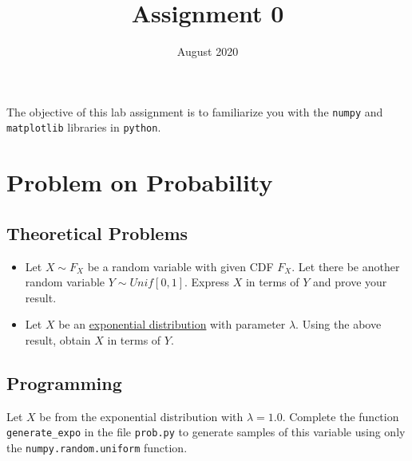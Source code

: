 \documentclass{article}
\title{Assignment 0}
\date{August 2020}
\begin{document}
\maketitle
The objective of this lab assignment is to familiarize you with the \texttt{numpy} and \texttt{matplotlib} libraries in \texttt{python}.



\section{Problem on Probability}
\subsection{Theoretical Problems}
\begin{itemize}[leftmargin=*]
\item Let $X \sim F_X$ be a random variable with given CDF $F_X$. Let there be another random variable $Y \sim Unif[0,1]$. Express $X$ in terms of $Y$ and prove your result. \\
\item Let $X$ be an \href{https://en.wikipedia.org/wiki/Exponential_distribution}{exponential distribution} with parameter $\lambda$. Using the above result, obtain $X$ in terms of $Y$.
\end{itemize}
\subsection{Programming}
Let $X$ be from the exponential distribution with $\lambda = 1.0$. Complete the function \texttt{generate\_expo} in the file \texttt{prob.py} to generate samples of this variable using only the \texttt{numpy.random.uniform} function. \\
\end{document}
